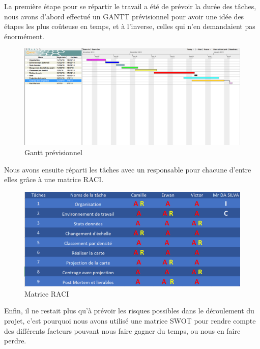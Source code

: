 \documentclass{article}
\begin{document}
\vspace{1\baselineskip}

La première étape pour se répartir le travail a été de prévoir la durée des tâches, nous avons d’abord effectué un GANTT prévisionnel pour avoir une idée des étapes les plus coûteuse en temps, et à l’inverse, celles qui n’en demandaient pas énormément.

\vspace{1\baselineskip}

\begin{figure}[H]
    \centering
    \includegraphics[scale=0.4]{gantt.png}
    \caption{Gantt prévisionnel}
    \label{fig:gantt}
\end{figure}

Nous avons ensuite réparti les tâches avec un responsable pour chacune d’entre elles grâce à une matrice RACI.

\vspace{1\baselineskip}

\begin{figure}[H]
    \centering
    \includegraphics[scale=0.4]{raci.png}
    \caption{Matrice RACI}
    \label{fig:raci}
\end{figure}

Enfin, il ne restait plus qu’à prévoir les risques possibles dans le déroulement du projet, c’est pourquoi nous avons utilisé une matrice SWOT pour rendre compte des différents facteurs pouvant nous faire gagner du temps, ou nous en faire perdre.
\end{document}

